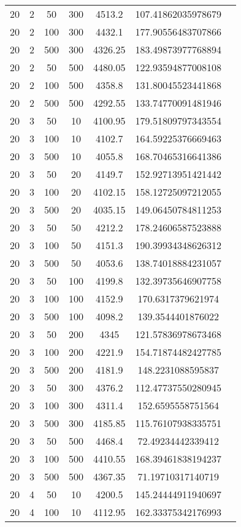 {\begin{longtabu}{S
S
S
S
S
S[round-mode=places,round-precision=0]
S[round-mode=places,round-precision=0]}
20 & 2 & 50 & 300 & 4513.2 & 107.41862035978679 \\
20 & 2 & 100 & 300 & 4432.1 & 177.90556483707866 \\
20 & 2 & 500 & 300 & 4326.25 & 183.49873977768894 \\
20 & 2 & 50 & 500 & 4480.05 & 122.93594877008108 \\
20 & 2 & 100 & 500 & 4358.8 & 131.80045523441868 \\
20 & 2 & 500 & 500 & 4292.55 & 133.74770091481946 \\
20 & 3 & 50 & 10 & 4100.95 & 179.51809797343554 \\
20 & 3 & 100 & 10 & 4102.7 & 164.59225376669463 \\
20 & 3 & 500 & 10 & 4055.8 & 168.70465316641386 \\
20 & 3 & 50 & 20 & 4149.7 & 152.92713951421442 \\
20 & 3 & 100 & 20 & 4102.15 & 158.12725097212055 \\
20 & 3 & 500 & 20 & 4035.15 & 149.06450784811253 \\
20 & 3 & 50 & 50 & 4212.2 & 178.24606587523888 \\
20 & 3 & 100 & 50 & 4151.3 & 190.39934348626312 \\
20 & 3 & 500 & 50 & 4053.6 & 138.74018884231057 \\
20 & 3 & 50 & 100 & 4199.8 & 132.39735646907758 \\
20 & 3 & 100 & 100 & 4152.9 & 170.6317379621974 \\
20 & 3 & 500 & 100 & 4098.2 & 139.3544401876022 \\
20 & 3 & 50 & 200 & 4345 & 121.57836978673468 \\
20 & 3 & 100 & 200 & 4221.9 & 154.71874482427785 \\
20 & 3 & 500 & 200 & 4181.9 & 148.2231088595837 \\
20 & 3 & 50 & 300 & 4376.2 & 112.47737550280945 \\
20 & 3 & 100 & 300 & 4311.4 & 152.6595558751564 \\
20 & 3 & 500 & 300 & 4185.85 & 115.76107938335751 \\
20 & 3 & 50 & 500 & 4468.4 & 72.49234442339412 \\
20 & 3 & 100 & 500 & 4410.55 & 168.39461838194237 \\
20 & 3 & 500 & 500 & 4367.35 & 71.19710317140719 \\
20 & 4 & 50 & 10 & 4200.5 & 145.24444911940697 \\
20 & 4 & 100 & 10 & 4112.95 & 162.33375342176993 \\

\end{longtabu}}

